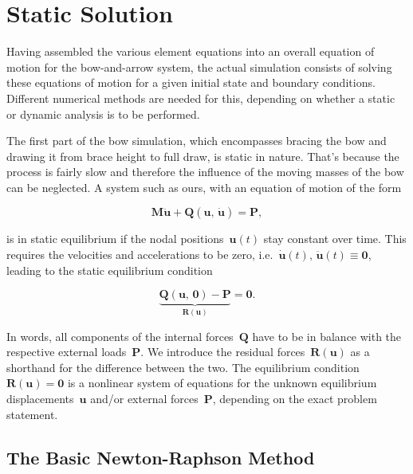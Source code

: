 
\chapter{Static Solution}
\label{chap:static-solution}

Having assembled the various element equations into an overall equation of motion for the bow-and-arrow system, the actual simulation consists of solving these equations of motion for a given initial state and boundary conditions.
Different numerical methods are needed for this, depending on whether a static or dynamic analysis is to be performed.

The first part of the bow simulation, which encompasses bracing the bow and drawing it from brace height to full draw, is static in nature.
That's because the process is fairly slow and therefore the influence of the moving masses of the bow can be neglected.
A system such as ours, with an equation of motion of the form

\begin{equation}
\boldsymbol{M}\ddot{\boldsymbol{u}} + \boldsymbol{Q}(\boldsymbol{u},\,\dot{\boldsymbol{u}}) = \boldsymbol{P},
\end{equation}

is in static equilibrium if the nodal positions~$\boldsymbol{u}(t)$ stay constant over time.
This requires the velocities and accelerations to be zero, i.e.~$\dot{\boldsymbol{u}}(t),\,\ddot{\boldsymbol{u}}(t) \equiv \boldsymbol{0}$, leading to the static equilibrium condition

\begin{equation}
\underbrace{\boldsymbol{Q}(\boldsymbol{u},\,\boldsymbol{0}) - \boldsymbol{P}}_{\boldsymbol{R}(\boldsymbol{u})} = \boldsymbol{0}. \label{eq:statics:equilibrium}
\end{equation}

In words, all components of the internal forces~$\boldsymbol{Q}$ have to be in balance with the respective external loads~$\boldsymbol{P}$.
We introduce the residual forces~$\boldsymbol{R}(\boldsymbol{u})$ as a shorthand for the difference between the two.
The equilibrium condition~$\boldsymbol{R}(\boldsymbol{u}) = \boldsymbol{0}$ is a nonlinear system of equations for the unknown equilibrium displacements~$\boldsymbol{u}$ and/or external forces~$\boldsymbol{P}$, depending on the exact problem statement.

\section{The Basic Newton-Raphson Method}

